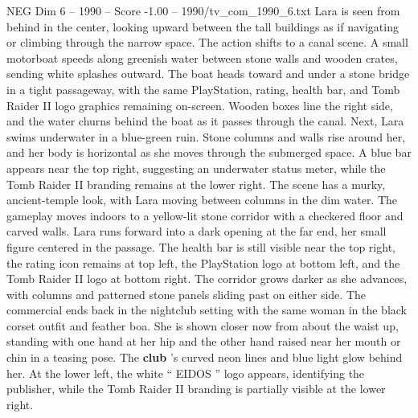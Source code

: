 \begin{textsample}{NEG Dim 6 – 1990 – Score -1.00 – 1990/tv\_com\_1990\_6.txt}
Lara is seen from behind in the center, looking upward between the tall buildings as if navigating or climbing through the narrow space.
The action shifts to a canal scene.
A small motorboat speeds along greenish water between stone walls and wooden crates, sending white splashes outward.
The boat heads toward and under a stone bridge in a tight passageway, with the same PlayStation, rating, health bar, and Tomb Raider II logo graphics remaining on-screen.
Wooden boxes line the right side, and the water churns behind the boat as it passes through the canal.
Next, Lara swims underwater in a blue-green ruin.
Stone columns and walls rise around her, and her body is horizontal as she moves through the submerged space.
A blue bar appears near the top right, suggesting an underwater status meter, while the Tomb Raider II branding remains at the lower right.
The scene has a murky, ancient-temple look, with Lara moving between columns in the dim water.
The gameplay moves indoors to a yellow-lit stone corridor with a checkered floor and carved walls.
Lara runs forward into a dark opening at the far end, her small figure centered in the passage.
The health bar is still visible near the top right, the rating icon remains at top left, the PlayStation logo at bottom left, and the Tomb Raider II logo at bottom right.
The corridor grows darker as she advances, with columns and patterned stone panels sliding past on either side.
The commercial ends back in the nightclub setting with the same woman in the black corset outfit and feather boa.
She is shown closer now from about the waist up, standing with one hand at her hip and the other hand raised near her mouth or chin in a teasing pose.
The \textbf{club} ’s curved neon lines and blue light glow behind her.
At the lower left, the white “ EIDOS ” logo appears, identifying the publisher, while the Tomb Raider II branding is partially visible at the lower right.

\end{textsample}
